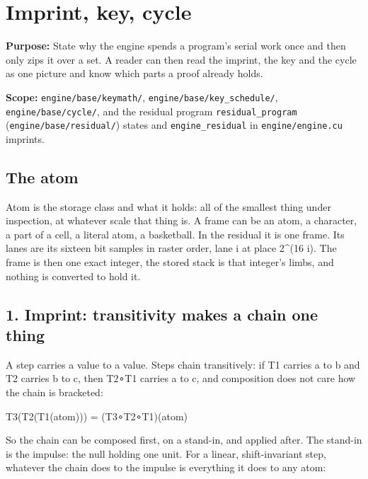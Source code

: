 \chapter{\texorpdfstring{Imprint, key, cycle}{Imprint, key, cycle}}
\label{chap:imprint-key-cycle}

\textbf{Purpose:} State why the engine spends a program's serial work once and then only zips it over a set. A reader can then read the imprint, the key and the cycle as one picture and know which parts a proof already holds.

\textbf{Scope:} \texttt{engine/\allowbreak{}base/\allowbreak{}keymath/\allowbreak{}}, \texttt{engine/\allowbreak{}base/\allowbreak{}key\_\allowbreak{}schedule/\allowbreak{}}, \texttt{engine/\allowbreak{}base/\allowbreak{}cycle/\allowbreak{}}, and the residual program \texttt{residual\_\allowbreak{}program} (\texttt{engine/\allowbreak{}base/\allowbreak{}residual/\allowbreak{}}) states and \texttt{engine\_\allowbreak{}residual} in \texttt{engine/\allowbreak{}engine.\allowbreak{}cu} imprints.

\section{\texorpdfstring{The atom}{The atom}}

Atom is the storage class and what it holds: all of the smallest thing under inspection, at whatever scale that thing is. A frame can be an atom, a character, a part of a cell, a literal atom, a basketball. In the residual it is one frame. Its lanes are its sixteen bit samples in raster order, lane i at place 2\textasciicircum{}(16 i). The frame is then one exact integer, the stored stack is that integer's limbs, and nothing is converted to hold it.

\section{\texorpdfstring{1. Imprint: transitivity makes a chain one thing}{1. Imprint: transitivity makes a chain one thing}}

A step carries a value to a value. Steps chain transitively: if T1 carries a to b and T2 carries b to c, then T2∘T1 carries a to c, and composition does not care how the chain is bracketed:

T3(T2(T1(atom))) = (T3∘T2∘T1)(atom)

So the chain can be composed first, on a stand-in, and applied after. The stand-in is the impulse: the null holding one unit. For a linear, shift-invariant step, whatever the chain does to the impulse is everything it does to any atom:

